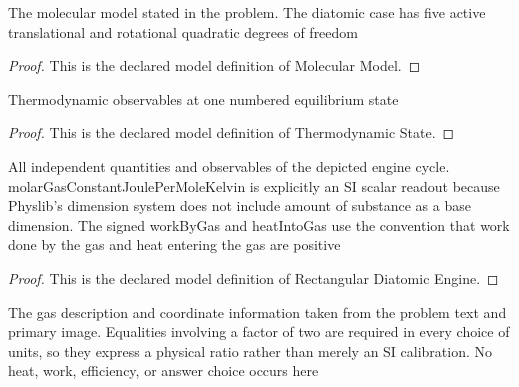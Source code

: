 \begin{definition}
  \label{def:physics:phyx-mini-0349:phyxminiproblems-problemphyxmini0349-molecularmodel}
  The molecular model stated in the problem. The diatomic case has five active translational and rotational quadratic degrees of freedom
\end{definition}
\begin{proof}
  This is the declared model definition of Molecular Model.
\end{proof}
\begin{definition}
  \label{def:physics:phyx-mini-0349:phyxminiproblems-problemphyxmini0349-thermodynamicstate}
  Thermodynamic observables at one numbered equilibrium state
\end{definition}
\begin{proof}
  This is the declared model definition of Thermodynamic State.
\end{proof}
\begin{definition}
  \label{def:physics:phyx-mini-0349:phyxminiproblems-problemphyxmini0349-rectangulardiatomicengine}
  All independent quantities and observables of the depicted engine cycle. molarGasConstantJoulePerMoleKelvin is explicitly an SI scalar readout because Physlib's dimension system does not include amount of substance as a base dimension. The signed workByGas and heatIntoGas use the convention that work done by the gas and heat entering the gas are positive
\end{definition}
\begin{proof}
  This is the declared model definition of Rectangular Diatomic Engine.
\end{proof}
\begin{definition}
  \label{def:physics:phyx-mini-0349:phyxminiproblems-problemphyxmini0349-matchesproblemstatementandfigure}
  The gas description and coordinate information taken from the problem text and primary image. Equalities involving a factor of two are required in every choice of units, so they express a physical ratio rather than merely an SI calibration. No heat, work, efficiency, or answer choice occurs here
\end{definition}
